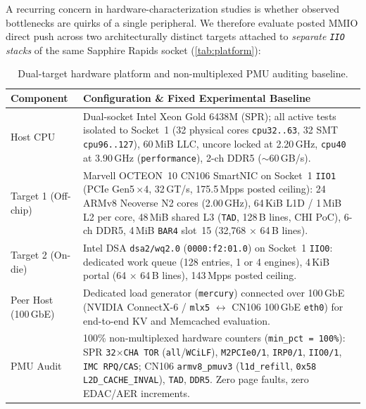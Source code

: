 A recurring concern in hardware-characterization studies is whether observed bottlenecks are quirks of a single peripheral. We therefore evaluate posted MMIO direct push across two architecturally distinct targets attached to \emph{separate \texttt{IIO} stacks} of the same Sapphire Rapids socket (\autoref{tab:platform}):

\begin{table}[t]
  \centering
  \scriptsize
  \setlength{\tabcolsep}{3.5pt}
  \begin{tabularx}{\columnwidth}{@{}l Y@{}}
    \toprule
    \textbf{Component} & \textbf{Configuration \& Fixed Experimental Baseline} \\
    \midrule
    Host CPU & Dual-socket Intel Xeon Gold 6438M (SPR); all active tests isolated to Socket~1 (32 physical cores \texttt{cpu32..63}, 32 SMT \texttt{cpu96..127}), 60\,MiB LLC, uncore locked at 2.20\,GHz, \texttt{cpu40} at 3.90\,GHz (\texttt{performance}), 2-ch DDR5 (\(\sim\)60\,GB/s). \\
    Target 1 (Off-chip) & Marvell OCTEON~10 CN106 SmartNIC on Socket~1 \texttt{IIO1} (PCIe Gen5\,$\times$4, 32\,GT/s, 175.5\,Mpps posted ceiling): 24 ARMv8 Neoverse N2 cores (2.00\,GHz), 64\,KiB L1D / 1\,MiB L2 per core, 48\,MiB shared L3 (\texttt{TAD}, 128\,B lines, CHI PoC), 6-ch DDR5, 4\,MiB \texttt{BAR4} slot~15 (32,768 $\times$ 64\,B lines). \\
    Target 2 (On-die) & Intel DSA \texttt{dsa2/wq2.0} (\texttt{0000:f2:01.0}) on Socket~1 \texttt{IIO0}: dedicated work queue (128 entries, 1 or 4 engines), 4\,KiB portal (64 $\times$ 64\,B lines), 143\,Mpps posted ceiling. \\
    Peer Host (100\,GbE) & Dedicated load generator (\texttt{mercury}) connected over 100\,GbE (NVIDIA ConnectX-6 / \texttt{mlx5} $\leftrightarrow$ CN106 100\,GbE \texttt{eth0}) for end-to-end KV and Memcached evaluation. \\
    PMU Audit & 100\% non-multiplexed hardware counters (\texttt{min\_pct\,=\,100\%}): SPR \texttt{32$\times$CHA TOR} (\texttt{all}/\texttt{WCiLF}), \texttt{M2PCIe0/1}, \texttt{IRP0/1}, \texttt{IIO0/1}, \texttt{IMC RPQ/CAS}; CN106 \texttt{armv8\_pmuv3} (\texttt{l1d\_refill}, \texttt{0x58 L2D\_CACHE\_INVAL}), \texttt{TAD}, \texttt{DDR5}. Zero page faults, zero EDAC/AER increments. \\
    \bottomrule
  \end{tabularx}
  \caption{Dual-target hardware platform and non-multiplexed PMU auditing baseline.}
  \label{tab:platform}
\end{table}

